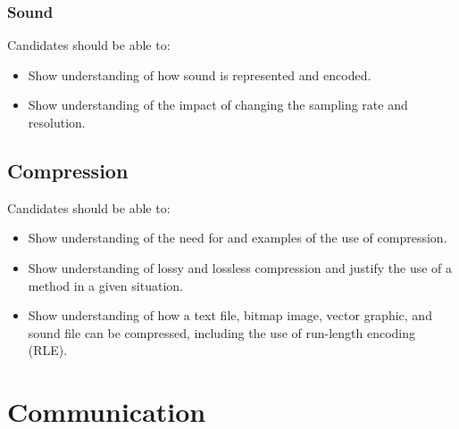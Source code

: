 \documentclass[a4paper]{article}
\begin{document}
\subsubsection{Sound}
Candidates should be able to:
\begin{itemize}
  \item Show understanding of how sound is represented and encoded.
  \item Show understanding of the impact of changing the sampling rate and resolution.
\end{itemize}

\subsection{Compression}
Candidates should be able to:
\begin{itemize}
  \item Show understanding of the need for and examples of the use of compression.
  \item Show understanding of lossy and lossless compression and justify the use of a method in a given situation.
  \item Show understanding of how a text file, bitmap image, vector graphic, and sound file can be compressed, including the use of run-length encoding (RLE).
\end{itemize}

\section{Communication}
\end{document}
